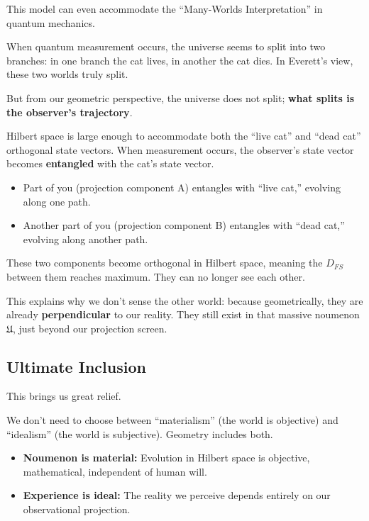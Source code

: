 This model can even accommodate the ``Many-Worlds Interpretation'' in quantum mechanics.

When quantum measurement occurs, the universe seems to split into two branches: in one branch the cat lives, in another the cat dies. In Everett's view, these two worlds truly split.

But from our geometric perspective, the universe does not split; \textbf{what splits is the observer's trajectory}.

Hilbert space is large enough to accommodate both the ``live cat'' and ``dead cat'' orthogonal state vectors. When measurement occurs, the observer's state vector becomes \textbf{entangled} with the cat's state vector.

\begin{itemize}
\item Part of you (projection component A) entangles with ``live cat,'' evolving along one path.

\item Another part of you (projection component B) entangles with ``dead cat,'' evolving along another path.
\end{itemize}

These two components become orthogonal in Hilbert space, meaning the $D_{FS}$ between them reaches maximum. They can no longer see each other.

This explains why we don't sense the other world: because geometrically, they are already \textbf{perpendicular} to our reality. They still exist in that massive noumenon $\mathfrak U$, just beyond our projection screen.

\subsection{Ultimate Inclusion}

This brings us great relief.

We don't need to choose between ``materialism'' (the world is objective) and ``idealism'' (the world is subjective). Geometry includes both.

\begin{itemize}
\item \textbf{Noumenon is material:} Evolution in Hilbert space is objective, mathematical, independent of human will.

\item \textbf{Experience is ideal:} The reality we perceive depends entirely on our observational projection.
\end{itemize}

